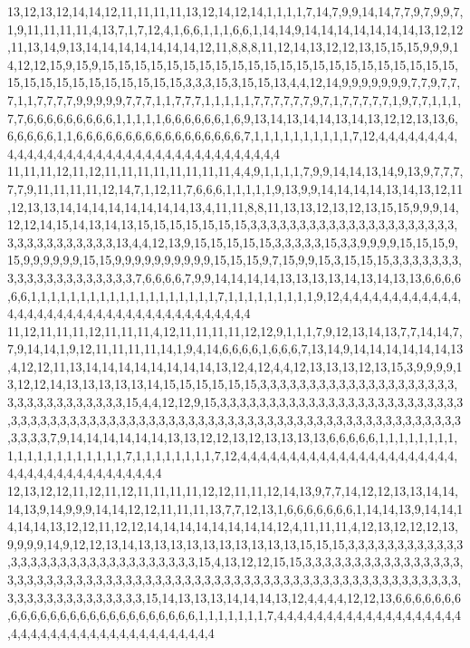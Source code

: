 13,12,13,12,14,14,12,11,11,11,11,13,12,14,12,14,1,1,1,1,7,14,7,9,9,14,14,7,7,9,7,9,9,7,1,9,11,11,11,11,4,13,7,1,7,12,4,1,6,6,1,1,1,6,6,1,14,14,9,14,14,14,14,14,14,14,13,12,12,11,13,14,9,13,14,14,14,14,14,14,14,12,11,8,8,8,11,12,14,13,12,12,13,15,15,15,9,9,9,14,12,12,15,9,15,9,15,15,15,15,15,15,15,15,15,15,15,15,15,15,15,15,15,15,15,15,15,15,15,15,15,15,15,15,15,15,15,15,15,3,3,3,15,3,15,15,13,4,4,12,14,9,9,9,9,9,9,9,7,7,9,7,7,7,1,1,7,7,7,7,9,9,9,9,9,7,7,7,1,1,7,7,7,1,1,1,1,1,7,7,7,7,7,7,9,7,1,7,7,7,7,7,1,9,7,7,1,1,1,7,7,6,6,6,6,6,6,6,6,6,1,1,1,1,1,6,6,6,6,6,6,1,6,9,13,14,13,14,14,13,14,13,12,12,13,13,6,6,6,6,6,6,1,1,6,6,6,6,6,6,6,6,6,6,6,6,6,6,6,6,6,7,1,1,1,1,1,1,1,1,1,1,7,12,4,4,4,4,4,4,4,4,4,4,4,4,4,4,4,4,4,4,4,4,4,4,4,4,4,4,4,4,4,4,4,4,4,4,4,4
11,11,11,12,11,12,11,11,11,11,11,11,11,11,4,4,9,1,1,1,1,7,9,9,14,14,13,14,9,13,9,7,7,7,7,7,9,11,11,11,11,12,14,7,1,12,11,7,6,6,6,1,1,1,1,1,9,13,9,9,14,14,14,14,13,14,13,12,11,12,13,13,14,14,14,14,14,14,14,14,13,4,11,11,8,8,11,13,13,12,13,12,13,15,15,9,9,9,14,12,12,14,15,14,13,14,13,15,15,15,15,15,15,15,3,3,3,3,3,3,3,3,3,3,3,3,3,3,3,3,3,3,3,3,3,3,3,3,3,3,3,3,3,3,3,3,13,4,4,12,13,9,15,15,15,15,15,3,3,3,3,3,15,3,3,9,9,9,9,15,15,15,9,15,9,9,9,9,9,9,15,15,9,9,9,9,9,9,9,9,9,9,15,15,15,9,7,15,9,9,15,3,15,15,15,3,3,3,3,3,3,3,3,3,3,3,3,3,3,3,3,3,3,3,3,7,6,6,6,6,7,9,9,14,14,14,14,13,13,13,13,14,13,14,13,13,6,6,6,6,6,6,1,1,1,1,1,1,1,1,1,1,1,1,1,1,1,1,1,1,1,7,1,1,1,1,1,1,1,1,1,9,12,4,4,4,4,4,4,4,4,4,4,4,4,4,4,4,4,4,4,4,4,4,4,4,4,4,4,4,4,4,4,4,4,4,4,4,4,4
11,12,11,11,11,12,11,11,11,4,12,11,11,11,11,12,12,9,1,1,1,7,9,12,13,14,13,7,7,14,14,7,7,9,14,14,1,9,12,11,11,11,11,14,1,9,4,14,6,6,6,6,1,6,6,6,7,13,14,9,14,14,14,14,14,14,13,4,12,12,11,13,14,14,14,14,14,14,14,14,13,12,4,12,4,4,12,13,13,13,12,13,15,3,9,9,9,9,13,12,12,14,13,13,13,13,13,14,15,15,15,15,15,15,3,3,3,3,3,3,3,3,3,3,3,3,3,3,3,3,3,3,3,3,3,3,3,3,3,3,3,3,3,3,3,3,15,4,4,12,12,9,15,3,3,3,3,3,3,3,3,3,3,3,3,3,3,3,3,3,3,3,3,3,3,3,3,3,3,3,3,3,3,3,3,3,3,3,3,3,3,3,3,3,3,3,3,3,3,3,3,3,3,3,3,3,3,3,3,3,3,3,3,3,3,3,3,3,3,3,3,3,3,3,3,3,3,3,7,9,14,14,14,14,14,14,13,13,12,12,13,12,13,13,13,13,6,6,6,6,6,1,1,1,1,1,1,1,1,1,1,1,1,1,1,1,1,1,1,1,1,7,1,1,1,1,1,1,1,1,7,12,4,4,4,4,4,4,4,4,4,4,4,4,4,4,4,4,4,4,4,4,4,4,4,4,4,4,4,4,4,4,4,4,4,4,4,4,4,4
12,13,12,12,11,12,11,12,11,11,11,11,12,12,11,11,12,14,13,9,7,7,14,12,12,13,13,14,14,14,13,9,14,9,9,9,14,14,12,12,11,11,11,13,7,7,12,13,1,6,6,6,6,6,6,6,1,14,14,13,9,14,14,14,14,14,13,12,12,11,12,12,14,14,14,14,14,14,14,14,12,4,11,11,11,4,12,13,12,12,12,13,9,9,9,9,14,9,12,12,13,14,13,13,13,13,13,13,13,13,13,13,15,15,15,3,3,3,3,3,3,3,3,3,3,3,3,3,3,3,3,3,3,3,3,3,3,3,3,3,3,3,3,3,3,3,15,4,13,12,12,15,15,3,3,3,3,3,3,3,3,3,3,3,3,3,3,3,3,3,3,3,3,3,3,3,3,3,3,3,3,3,3,3,3,3,3,3,3,3,3,3,3,3,3,3,3,3,3,3,3,3,3,3,3,3,3,3,3,3,3,3,3,3,3,3,3,3,3,3,3,3,3,3,3,3,3,3,3,15,14,13,13,13,14,14,14,13,12,4,4,4,4,12,12,13,6,6,6,6,6,6,6,6,6,6,6,6,6,6,6,6,6,6,6,6,6,6,6,6,6,6,1,1,1,1,1,1,1,7,4,4,4,4,4,4,4,4,4,4,4,4,4,4,4,4,4,4,4,4,4,4,4,4,4,4,4,4,4,4,4,4,4,4,4,4,4,4,4,4
